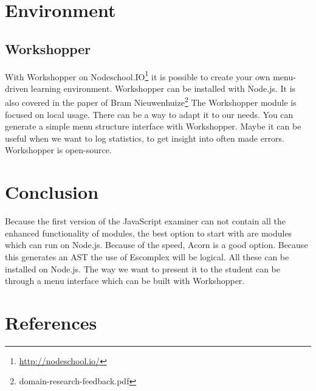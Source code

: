 \documentclass{article}
\begin{document}
\section{Environment}
\subsection{Workshopper}
With Workshopper on Nodeschool.IO\footnote{\url{http://nodeschool.io/}} it is possible to create your own menu-driven learning environment. 
Workshopper can be installed with Node.js.
It is also covered in the paper of Bram Nieuwenhuize\footnote{domain-research-feedback.pdf}
The Workshopper module is focused on local usage. There can be a way to adapt it to our needs.
You can generate a simple menu structure interface with Workshopper.
Maybe it can be useful when we want to log statistics, to get insight into often made errors.
Workshopper is open-source. 

\section{Conclusion}
Because the first version of the JavaScript examiner can not contain all the enhanced 
functionality of modules, the best option to start with are modules which can run on Node.js.
Because of the speed, Acorn is a good option. Because this generates an AST the use of Escomplex will be logical.
All these can be installed on Node.js. 
The way we want to present it to the student can be through a menu interface which can be built with Workshopper.

\section{References}
\end{document}
